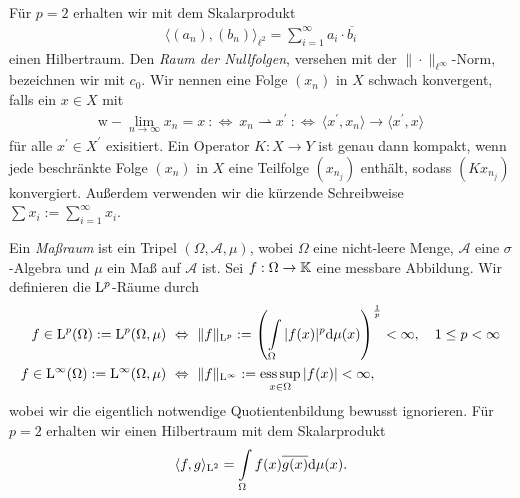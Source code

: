 Für $ p = 2 $ erhalten wir mit dem Skalarprodukt
\begin{align*}
	\langle(a_n),(b_n ) \rangle_{\ell^2} 
	=
	\sum \limits_{i = 1}^\infty a_i \cdot \overline{b_i}
\end{align*}
einen Hilbertraum.
Den \textit{Raum der Nullfolgen}, versehen mit der $ \|\cdot\|_{\ell^\infty} $-Norm, bezeichnen wir mit $  c_0  $.
Wir nennen eine Folge $ (x_n) $ in $ X $ schwach konvergent, falls ein $ x \in X $ mit
\begin{align*} 
	\textrm{w}-\lim \limits_{n \to \infty } x_n = x
	\ :\Leftrightarrow \
	x_n \rightharpoonup x^\prime  \ :\Leftrightarrow \
	\langle x^\prime , x_n \rangle
	\rightarrow
	\langle x^\prime , x \rangle
\end{align*}
für alle $ x^\prime \in X^\prime $ exisitiert.
Ein Operator $ K : X  \to Y  $ ist genau dann kompakt, wenn jede beschränkte Folge $ (x_n) $ in $ X $ eine Teilfolge $ (x_{n_j}) $ enthält, sodass $ (K x_{n_j}) $ konvergiert\cite[Abschnitt 8.1]{Alt2012}. 
Außerdem verwenden wir die kürzende Schreibweise $ \sum x_i := \sum_{ i = 1}^\infty x_i $.

Ein \textit{Maßraum} ist ein Tripel $ (\Omega, \mathcal{A}, \mu) $, wobei $ \Omega $ eine nicht-leere Menge, $ \mathcal{A} $ eine $ \sigma $-Algebra und $ \mu  $ ein Maß auf $ \mathcal{A} $ ist.
Sei $ f : \Omega \to \mathbb{K} $ eine messbare Abbildung.
Wir definieren die $ \mathrm{L}^p $-Räume durch
\begin{align*}
	f \in \mathrm{L}^p(\Omega) := \mathrm{L}^p(\Omega, \mu)
	\ &\Leftrightarrow \
	\| f \|_{\mathrm{L}^p}:= 
	\left(\int \limits_{\Omega} |f(x)|^p \mathrm{d}\mu(x) \right)^\frac{1}{p} < \infty, \quad 1 \leq p < \infty\\
	f \in \mathrm{L}^\infty(\Omega) := \mathrm{L}^\infty(\Omega, \mu)
	\ &\Leftrightarrow \
	\| f \|_{\mathrm{L}^\infty}:= 
	\operatorname*{ess\,sup} \limits_{x \in \Omega} |f(x)| < \infty,
\end{align*}
wobei wir die eigentlich notwendige Quotientenbildung\cite[Kapitel 1]{Werner2011} bewusst ignorieren. Für $ p = 2 $ erhalten wir einen Hilbertraum mit dem 
Skalarprodukt
\begin{align*}
	\langle f, g \rangle_{\mathrm{L}^2}
	=
	\int \limits_{\Omega} f(x) \overline{g(x)} \mathrm{d}\mu(x)
	.
\end{align*}

